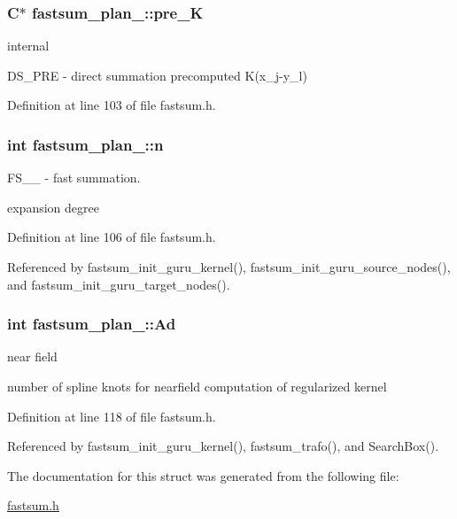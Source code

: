 \hypertarget{structfastsum__plan___abb4a9dc73722c3920d73bfaefd2affdf}{
\subsubsection[{pre\-\_\-\-K}]{\setlength{\rightskip}{0pt plus 5cm}C$\ast$ fastsum\-\_\-plan\-\_\-\-::pre\-\_\-\-K}}\label{structfastsum__plan___abb4a9dc73722c3920d73bfaefd2affdf}


internal 

D\-S\-\_\-\-P\-R\-E -\/ direct summation precomputed K(x\-\_\-j-\/y\-\_\-l) 

Definition at line 103 of file fastsum.\-h.

\hypertarget{structfastsum__plan___a271a9a4e952484997e902c5cbd5ff084}{
\subsubsection[{n}]{\setlength{\rightskip}{0pt plus 5cm}int fastsum\-\_\-plan\-\_\-\-::n}}\label{structfastsum__plan___a271a9a4e952484997e902c5cbd5ff084}


F\-S\-\_\-\-\_\- -\/ fast summation. 

expansion degree 

Definition at line 106 of file fastsum.\-h.



Referenced by fastsum\-\_\-init\-\_\-guru\-\_\-kernel(), fastsum\-\_\-init\-\_\-guru\-\_\-source\-\_\-nodes(), and fastsum\-\_\-init\-\_\-guru\-\_\-target\-\_\-nodes().

\hypertarget{structfastsum__plan___a29d4d3dc57d0b1713444efcfddf1b5ef}{
\subsubsection[{Ad}]{\setlength{\rightskip}{0pt plus 5cm}int fastsum\-\_\-plan\-\_\-\-::\-Ad}}\label{structfastsum__plan___a29d4d3dc57d0b1713444efcfddf1b5ef}


near field 

number of spline knots for nearfield computation of regularized kernel 

Definition at line 118 of file fastsum.\-h.



Referenced by fastsum\-\_\-init\-\_\-guru\-\_\-kernel(), fastsum\-\_\-trafo(), and Search\-Box().



The documentation for this struct was generated from the following file\-:\begin{DoxyCompactItemize}
\item 
\hyperlink{fastsum_8h}{fastsum.\-h}\end{DoxyCompactItemize}
